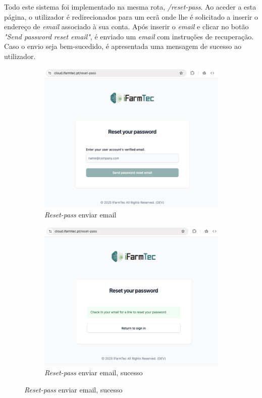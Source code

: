 Todo este sistema foi implementado na mesma rota, \textit{/reset-pass}. Ao aceder a esta página, o utilizador é redirecionados para um ecrã onde lhe é solicitado a inserir o endereço de \textit{email} associado à sua conta. Após inserir o \textit{email} e clicar no botão \textit{"Send password reset email"}, é enviado um \textit{email} com instruções de recuperação. Caso o envio seja bem-sucedido, é apresentada uma mensagem de sucesso ao utilizador.

\begin{figure}[h!]
	\centering
	\begin{subfigure}[c]{0.30\textwidth}
		\centering
		\includegraphics[width=\textwidth]{figs/reset-pass-1.png}
		\caption{\textit{Reset-pass} enviar email}
		\label{fig:resetPassEmail}
	\end{subfigure}
	\hfill
	\begin{subfigure}[c]{0.30\textwidth}
		\centering
		\includegraphics[width=\textwidth]{figs/reset-pass-2.png}
		\caption{\textit{Reset-pass} enviar email, sucesso}
		\label{fig:resetPassEmailSuc}
	\end{subfigure}


\end{figure}
